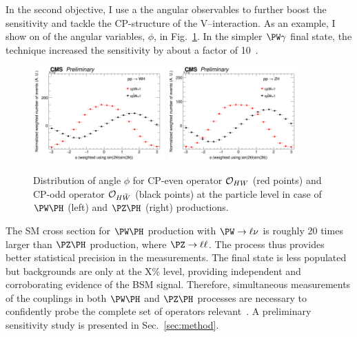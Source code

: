 \documentclass[a4paper,11pt]{article}
\renewcommand{\PV}{{{{V}}}\xspace}
\begin{document}
In the second objective, I use a the angular observables to further boost the sensitivity and tackle the CP-structure of the \PV--\PH interaction. As an example, I show on of the angular variables, $\phi$, in Fig.~\ref{fig:LHE_phi}. %
In the simpler $\PW\gamma$ final state, the technique increased the sensitivity by about a factor of 10~\cite{CMS-PAS-SMP-20-005}.
\begin{figure}[hbtp]
\begin{center}
\includegraphics[width=0.45\textwidth]{Figures/LHE/WH/LHE_Plot_phi.png}
\includegraphics[width=0.45\textwidth]{Figures/LHE/ZH/LHE_Plot_phi.png}
\end{center}
\caption{
Distribution of angle $\phi$ for CP-even operator ${\cal O}_{HW}$  (red points) and CP-odd operator ${\cal O}_{H\tilde{W}}$ (black points) at the particle level in case of $\PW\PH$ (left) and $\PZ\PH$ (right) productions.
}
\label{fig:LHE_phi}
\end{figure}

The SM cross section for $\PW\PH$ production with  $\PW\rightarrow\ell\nu$  is roughly 20 times larger than $\PZ\PH$ production, where $\PZ\rightarrow\ell\ell$.
The \PW process thus provides better statistical precision in the measurements. %
The \PZ final state is less populated but backgrounds are only at the X\% level, providing independent and corroborating evidence of the BSM signal. 
Therefore, simultaneous measurements of the couplings in both $\PW\PH$ and $\PZ\PH$ processes are necessary to confidently probe the complete set of operators relevant~\cite{Banerjee:2019twi}.
A preliminary sensitivity study is presented in Sec.~\ref{sec:method}. 
\end{document}
